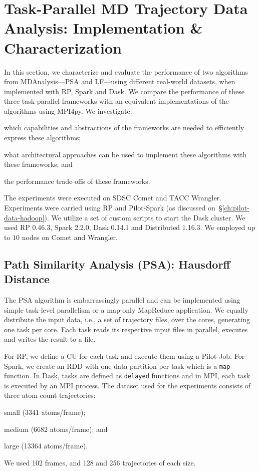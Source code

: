 \section{Task-Parallel MD Trajectory Data Analysis: Implementation \& Characterization}
\label{sec:impl_exp}

In this section, we characterize and evaluate the performance of two algorithms
from MDAnalysis---PSA and LF---using different real-world datasets,
when implemented with RP, Spark and Dask. We compare the performance
of these three task-parallel frameworks with an equivalent implementations of
the algorithms using MPI4py. We investigate:
\begin{inparaenum}[1)]
    \item which capabilities and abstractions of the frameworks are needed to
    efficiently express these algorithms;
    \item what architectural approaches can be used to implement these
    algorithms with these frameworks; and
    \item the performance trade-offs of these frameworks.
\end{inparaenum}

The experiments were executed on SDSC Comet and TACC Wrangler. Experiments were
carried using RP and Pilot-Spark (as discussed
on~\S\ref{ch:pilot-data-hadoop}). We utilize a set of custom scripts to start
the Dask cluster. We used RP 0.46.3, Spark 2.2.0, Dask 0.14.1 and
Distributed 1.16.3.
We employed up to $10$ nodes on Comet and Wrangler.

\subsection{Path Similarity Analysis (PSA): Hausdorff Distance}
\label{sec:psa}

The PSA algorithm is embarrassingly parallel and can be implemented using simple
task-level parallelism or a map-only MapReduce application. We equally distribute
the input data, i.e., a set of trajectory files, over the cores,
generating one task per core. Each task reads its respective input files in
parallel, executes and writes the result to a file.

For RP, we define a CU for each task and execute them using
a Pilot-Job. For Spark, we create an RDD with one data partition per task which
is a \texttt{map} function. In Dask, tasks are defined as
\texttt{delayed} functions and in MPI, each task is executed by an MPI process.
The dataset used for the experiments consists of three atom count trajectories:
\begin{inparaenum}[1)]
    \item small (3341 atoms/frame);
    \item medium (6682 atoms/frame); and
    \item large (13364 atoms/frame).
\end{inparaenum}
We used 102 frames, and 128 and 256 trajectories of each size.

